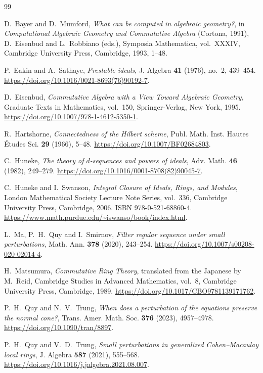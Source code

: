 \documentclass[11pt,reqno]{amsart}
\numberwithin{equation}{section}
\theoremstyle{definition}
\begin{document}
\begin{thebibliography}{99}

D.~Bayer and D.~Mumford, \emph{What can be computed in algebraic geometry?}, in \emph{Computational Algebraic Geometry and Commutative Algebra} (Cortona, 1991), D.~Eisenbud and L.~Robbiano (eds.), Symposia Mathematica, vol.~XXXIV, Cambridge University Press, Cambridge, 1993, 1--48.

P.~Eakin and A.~Sathaye, \emph{Prestable ideals}, J. Algebra \textbf{41} (1976), no.~2, 439--454. \url{https://doi.org/10.1016/0021-8693(76)90192-7}.

D.~Eisenbud, \emph{Commutative Algebra with a View Toward Algebraic Geometry}, Graduate Texts in Mathematics, vol.~150, Springer-Verlag, New York, 1995. \url{https://doi.org/10.1007/978-1-4612-5350-1}.

R.~Hartshorne, \emph{Connectedness of the Hilbert scheme}, Publ. Math. Inst. Hautes \'Etudes Sci. \textbf{29} (1966), 5--48. \url{https://doi.org/10.1007/BF02684803}.

C.~Huneke, \emph{The theory of $d$-sequences and powers of ideals}, Adv. Math. \textbf{46} (1982), 249--279. \url{https://doi.org/10.1016/0001-8708(82)90045-7}.

C.~Huneke and I.~Swanson, \emph{Integral Closure of Ideals, Rings, and Modules}, London Mathematical Society Lecture Note Series, vol.~336, Cambridge University Press, Cambridge, 2006. ISBN 978-0-521-68860-4. \url{https://www.math.purdue.edu/~iswanso/book/index.html}.

L.~Ma, P.~H.~Quy and I.~Smirnov, \emph{Filter regular sequence under small perturbations}, Math. Ann. \textbf{378} (2020), 243--254. \url{https://doi.org/10.1007/s00208-020-02014-4}.

H.~Matsumura, \emph{Commutative Ring Theory}, translated from the Japanese by M.~Reid, Cambridge Studies in Advanced Mathematics, vol.~8, Cambridge University Press, Cambridge, 1989. \url{https://doi.org/10.1017/CBO9781139171762}.

P.~H.~Quy and N.~V.~Trung, \emph{When does a perturbation of the equations preserve the normal cone?}, Trans. Amer. Math. Soc. \textbf{376} (2023), 4957--4978. \url{https://doi.org/10.1090/tran/8897}.

P.~H.~Quy and V.~D.~Trung, \emph{Small perturbations in generalized Cohen--Macaulay local rings}, J. Algebra \textbf{587} (2021), 555--568. \url{https://doi.org/10.1016/j.jalgebra.2021.08.007}.


\end{thebibliography}
\end{document}
